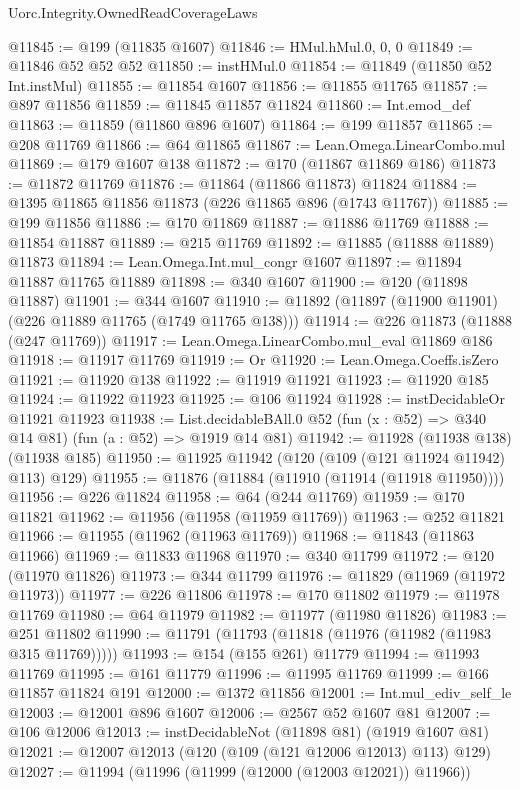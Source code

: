 \begin{lexlean}{Uorc.Integrity.OwnedReadCoverageLaws}
\begin{coremodule}
@11845 := @199 (@11835 @1607)
@11846 := HMul.hMul.{0, 0, 0}
@11849 := @11846 @52 @52 @52
@11850 := instHMul.{0}
@11854 := @11849 (@11850 @52 Int.instMul)
@11855 := @11854 @1607
@11856 := @11855 @11765
@11857 := @897 @11856
@11859 := @11845 @11857 @11824
@11860 := Int.emod_def
@11863 := @11859 (@11860 @896 @1607)
@11864 := @199 @11857
@11865 := @208 @11769
@11866 := @64 @11865
@11867 := Lean.Omega.LinearCombo.mul
@11869 := @179 @1607 @138
@11872 := @170 (@11867 @11869 @186)
@11873 := @11872 @11769
@11876 := @11864 (@11866 @11873) @11824
@11884 := @1395 @11865 @11856 @11873 (@226 @11865 @896 (@1743 @11767))
@11885 := @199 @11856
@11886 := @170 @11869
@11887 := @11886 @11769
@11888 := @11854 @11887
@11889 := @215 @11769
@11892 := @11885 (@11888 @11889) @11873
@11894 := Lean.Omega.Int.mul_congr @1607
@11897 := @11894 @11887 @11765 @11889
@11898 := @340 @1607
@11900 := @120 (@11898 @11887)
@11901 := @344 @1607
@11910 := @11892 (@11897 (@11900 @11901) (@226 @11889 @11765 (@1749 @11765 @138)))
@11914 := @226 @11873 (@11888 (@247 @11769))
@11917 := Lean.Omega.LinearCombo.mul_eval @11869 @186
@11918 := @11917 @11769
@11919 := Or
@11920 := Lean.Omega.Coeffs.isZero
@11921 := @11920 @138
@11922 := @11919 @11921
@11923 := @11920 @185
@11924 := @11922 @11923
@11925 := @106 @11924
@11928 := instDecidableOr @11921 @11923
@11938 := List.decidableBAll.{0}
    @52
    (fun (x : @52) => @340 @14 @81)
    (fun (a : @52) => @1919 @14 @81)
@11942 := @11928 (@11938 @138) (@11938 @185)
@11950 := @11925 @11942 (@120 (@109 (@121 @11924 @11942) @113) @129)
@11955 := @11876 (@11884 (@11910 (@11914 (@11918 @11950))))
@11956 := @226 @11824
@11958 := @64 (@244 @11769)
@11959 := @170 @11821
@11962 := @11956 (@11958 (@11959 @11769))
@11963 := @252 @11821
@11966 := @11955 (@11962 (@11963 @11769))
@11968 := @11843 (@11863 @11966)
@11969 := @11833 @11968
@11970 := @340 @11799
@11972 := @120 (@11970 @11826)
@11973 := @344 @11799
@11976 := @11829 (@11969 (@11972 @11973))
@11977 := @226 @11806
@11978 := @170 @11802
@11979 := @11978 @11769
@11980 := @64 @11979
@11982 := @11977 (@11980 @11826)
@11983 := @251 @11802
@11990 := @11791 (@11793 (@11818 (@11976 (@11982 (@11983 @315 @11769)))))
@11993 := @154 (@155 @261) @11779
@11994 := @11993 @11769
@11995 := @161 @11779
@11996 := @11995 @11769
@11999 := @166 @11857 @11824 @191
@12000 := @1372 @11856
@12001 := Int.mul_ediv_self_le
@12003 := @12001 @896 @1607
@12006 := @2567 @52 @1607 @81
@12007 := @106 @12006
@12013 := instDecidableNot (@11898 @81) (@1919 @1607 @81)
@12021 := @12007 @12013 (@120 (@109 (@121 @12006 @12013) @113) @129)
@12027 := @11994 (@11996 (@11999 (@12000 (@12003 @12021)) @11966))

\end{coremodule}
\end{lexlean}
